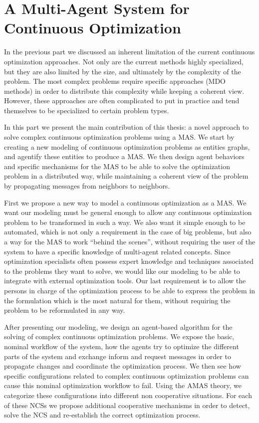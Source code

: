 \part{A Multi-Agent System for Continuous Optimization}\label{MAS4Optim_part}

In the previous part we discussed an inherent limitation of the current continuous optimization approaches. Not only are the current methods highly specialized, but they are also limited by the size, and ultimately by the complexity of the problem. The most complex problems require specific approaches (MDO methods) in order to distribute this complexity while keeping a coherent view. However, these approaches are often complicated to put in practice and tend themselves to be specialized to certain problem types.

In this part we present the main contribution of this thesis: a novel approach to solve complex continuous optimization problems using a MAS. We start by creating a new modeling of continuous optimization problems as entities graphs, and agentify these entities to produce a MAS. We then design agent behaviors and specific mechanisms for the MAS to be able to solve the optimization problem in a distributed way, while maintaining a coherent view of the problem by propagating messages from neighbors to neighbors. 

First we propose a new way to model a continuous optimization as a MAS. We want our modeling must be general enough to allow any continuous optimization problem to be transformed in such a way. We also want it simple enough to be automated, which is not only a requirement in the case of big problems, but also a way for the MAS to work \enquote{behind the scenes}, without requiring the user of the system to have a specific knowledge of multi-agent related concepts. Since optimization specialists often possess expert knowledge and techniques associated to the problems they want to solve, we would like our modeling to be able to integrate with external optimization tools. Our last requirement is to allow the persons in charge of the optimization process to be able to express the problem in the formulation which is the most natural for them, without requiring the problem to be reformulated in any way.

After presenting our modeling, we design an agent-based algorithm for the solving of complex continuous optimization problems. We expose the basic, nominal workflow of the system, how the agents try to optimize the different parts of the system and exchange inform and request messages in order to propagate changes and coordinate the optimization process. We then see how specific configurations related to complex continuous optimization problems can cause this nominal optimization workflow to fail. Using the AMAS theory, we categorize these configurations into different non cooperative situations. For each of these NCSs we propose additional cooperative mechanisms in order to detect, solve the NCS and re-establish the correct optimization process.

